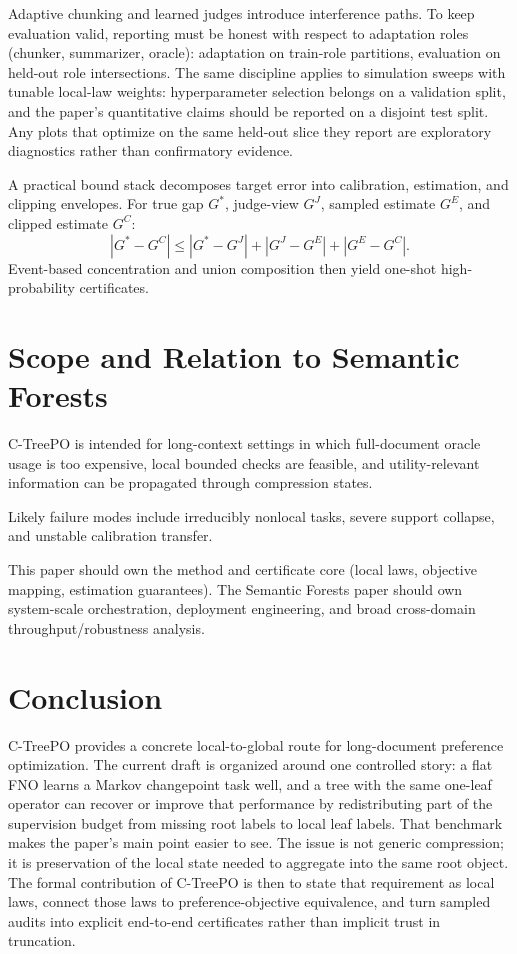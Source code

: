 \documentclass[11pt]{article}
\begin{document}
Adaptive chunking and learned judges introduce interference paths.
To keep evaluation valid, reporting must be honest with respect to adaptation roles (chunker, summarizer, oracle): adaptation on train-role partitions, evaluation on held-out role intersections.
The same discipline applies to simulation sweeps with tunable local-law weights: hyperparameter selection belongs on a validation split, and the paper's quantitative claims should be reported on a disjoint test split. Any plots that optimize on the same held-out slice they report are exploratory diagnostics rather than confirmatory evidence.

A practical bound stack decomposes target error into calibration, estimation, and clipping envelopes.
For true gap $G^\ast$, judge-view $G^J$, sampled estimate $G^E$, and clipped estimate $G^C$:
\[
|G^\ast-G^C| \le |G^\ast-G^J| + |G^J-G^E| + |G^E-G^C|.
\]
Event-based concentration and union composition then yield one-shot high-probability certificates.

\section{Scope and Relation to Semantic Forests}\label{sec:scope}

C-TreePO is intended for long-context settings in which full-document oracle usage is too expensive, local bounded checks are feasible, and utility-relevant information can be propagated through compression states.

Likely failure modes include irreducibly nonlocal tasks, severe support collapse, and unstable calibration transfer.

This paper should own the method and certificate core (local laws, objective mapping, estimation guarantees).
The Semantic Forests paper should own system-scale orchestration, deployment engineering, and broad cross-domain throughput/robustness analysis.

\section{Conclusion}\label{sec:conclusion}

C-TreePO provides a concrete local-to-global route for long-document preference optimization.
The current draft is organized around one controlled story: a flat FNO learns a Markov changepoint task well, and a tree with the same one-leaf operator can recover or improve that performance by redistributing part of the supervision budget from missing root labels to local leaf labels.
That benchmark makes the paper's main point easier to see. The issue is not generic compression; it is preservation of the local state needed to aggregate into the same root object.
The formal contribution of C-TreePO is then to state that requirement as local laws, connect those laws to preference-objective equivalence, and turn sampled audits into explicit end-to-end certificates rather than implicit trust in truncation.
\end{document}

